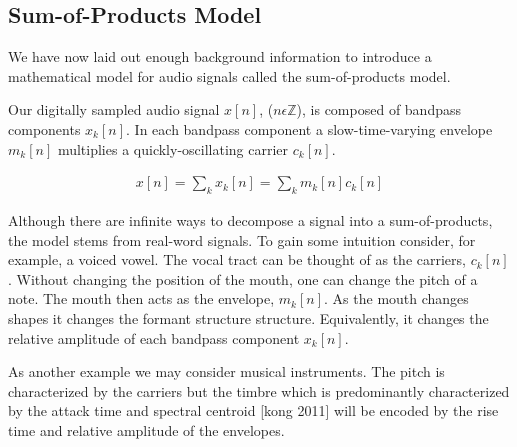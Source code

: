 \documentclass [11pt, proquest] {uwthesis}[2015/03/03]
\begin{document}
\subsection{Sum-of-Products Model}

We have now laid out enough background information to introduce a mathematical model for audio signals called the sum-of-products model.

Our digitally sampled audio signal $x[n]$, ($n \epsilon \mathbb{Z}$), is composed of bandpass components $x_k[n]$.  In each bandpass component a slow-time-varying envelope $m_k[n]$ multiplies a quickly-oscillating carrier $c_k[n]$.

\begin{align}
\label{eq:sum-of-products}
x[n] = \sum\limits_k x_k[n] = \sum\limits_k m_k[n] c_k[n]
\end{align}

Although there are infinite ways to decompose a signal into a sum-of-products, the model stems from real-word signals.  To gain some intuition consider, for example, a voiced vowel.  The vocal tract can be thought of as the carriers, $c_k[n]$.  Without changing the position of the mouth, one can change the pitch of a note.  The mouth then acts as the envelope, $m_k[n]$.  As the mouth changes shapes it changes the formant structure structure.  Equivalently, it changes the relative amplitude of each bandpass component $x_k[n]$.

As another example we may consider musical instruments.  The pitch is characterized by the carriers but the timbre which is predominantly characterized by the attack time and spectral centroid [kong 2011] will be encoded by the rise time and relative amplitude of the envelopes.

\end{document}
